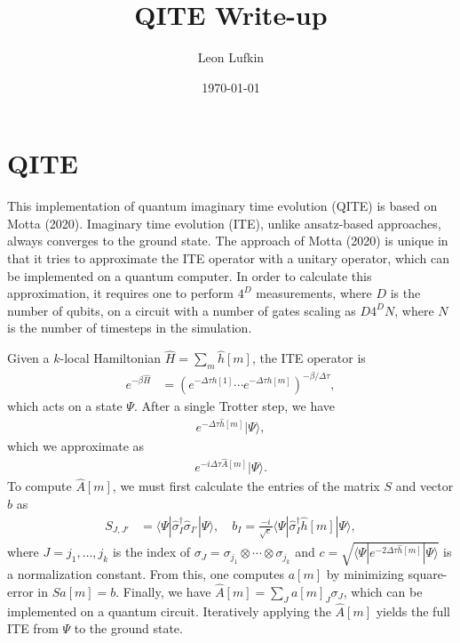 \documentclass{article}
\title{QITE Write-up}
\author{Leon Lufkin}
\date{\today}
\begin{document}

\section{QITE}
This implementation of quantum imaginary time evolution (QITE) is based on Motta (2020).
Imaginary time evolution (ITE), unlike ansatz-based approaches, always converges to the ground state.
The approach of Motta (2020) is unique in that it tries to approximate the ITE operator with a unitary operator, which can be implemented on a quantum computer.
In order to calculate this approximation, it requires one to perform $4^D$ measurements, where $D$ is the number of qubits, on a circuit with a number of gates scaling as $D 4^D N$, where $N$ is the number of timesteps in the simulation.

Given a $k$-local Hamiltonian $\hat{H} = \sum_{m} \hat{h}[m]$, the ITE operator is 
\begin{align}
    e^{-\beta \hat{H}} &= \left( e^{-\Delta \tau h[1]} \cdots e^{-\Delta \tau h[m]} \right)^{-\beta/\Delta \tau},
\end{align}
which acts on a state $\Psi$.
After a single Trotter step, we have
\begin{align}
    e^{-\Delta \tau \hat{h}[m]} | \Psi \rangle,
\end{align}
which we approximate as
\begin{align}
    e^{-i \Delta \tau \hat{A}[m]} | \Psi \rangle.
\end{align}
To compute $\hat{A}[m]$, we must first calculate the entries of the matrix $S$ and vector $b$ as
\begin{align} \label{eq:linear_eq}
    S_{J,J'} &= \langle \Psi | \hat{\sigma}_I^\dagger \hat{\sigma}_{I'} | \Psi \rangle, 
    \quad b_I = \frac{-i}{\sqrt{c}} \langle \Psi | \hat{\sigma}_I^\dagger \hat{h}[m] | \Psi \rangle,
\end{align}
where $J = j_1, \ldots, j_k$ is the index of $\sigma_J = \sigma_{j_1} \otimes \cdots \otimes \sigma_{j_k}$ and $c = \sqrt{ \langle \Psi | e^{-2 \Delta \tau \hat{h}[m]} | \Psi \rangle }$ is a normalization constant.
From this, one computes $a[m]$ by minimizing square-error in $S a[m] = b$.
Finally, we have $\hat{A}[m] = \sum_{J} a[m]_J \sigma_J$, which can be implemented on a quantum circuit.
Iteratively applying the $\hat{A}[m]$ yields the full ITE from $\Psi$ to the ground state.
\end{document}
